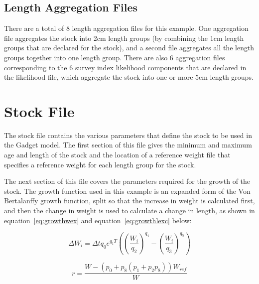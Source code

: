 \documentclass[10pt,twoside]{article}
\begin{document}
{\small }

\subsection{Length Aggregation Files}
There are a total of 8 length aggregation files for this example.  One aggregation file aggregates the stock into 2cm length groups (by combining the 1cm length groups that are declared for the stock), and a second file aggregates all the length groups together into one length group.  There are also 6 aggregation files corresponding to the 6 survey index likelihood components that are declared in the likelihood file, which aggregate the stock into one or more 5cm length groups.

{\small }
{\small }
{\small }
{\small }
{\small }
{\small }
{\small }
{\small }

\section{Stock File}
The stock file contains the various parameters that define the stock to be used in the Gadget model.  The first section of this file gives the minimum and maximum age and length of the stock and the location of a reference weight file that specifies a reference weight for each length group for the stock.

\bigskip
The next section of this file covers the parameters required for the growth of the stock.  The growth function used in this example is an expanded form of the Von Bertalanffy growth function, split so that the increase in weight is calculated first, and then the change in weight is used to calculate a change in length, as shown in equation~\ref{eq:growthwex} and equation~\ref{eq:growthlexc} below:

\begin{equation}\label{eq:growthwex}
\Delta W_i = \Delta t q_0 e^{q_1T}\left(\left( \frac{W_i}{q_2} \right)^{q_4} - \left( \frac{W_i}{q_3} \right)^{q_5} \right)
\end{equation}

\begin{equation}\label{eq:growthlexa}
 r = \frac{W - \left( p_{0} + p_{8} \left( p_{1} + p_{2}p_{8} \right) \right) W_{ref}}{W}
\end{equation}
\end{document}
